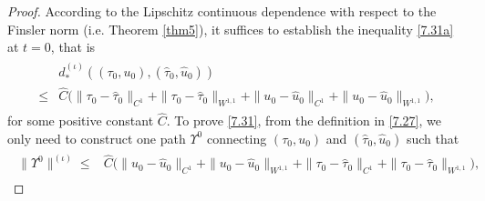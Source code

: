 \documentclass[11pt,reqno]{article}
\numberwithin{equation}{section}
\begin{document}
\begin{proof}
According to the Lipschitz continuous dependence with respect to the Finsler norm (i.e. Theorem \ref{thm5}), it suffices to establish the inequality \eqref{7.31a} at $t=0$, that is
\begin{align}\label{7.31}
\begin{split}
&d_{*}^{(\iota)}((\tau_0, u_0), (\hat{\tau}_0, \hat{u}_0)) \\
\leq & \widehat{C}\Big(\|\tau_0-\hat{\tau}_0\|_{C^1} + \|\tau_0-\hat{\tau}_0\|_{W^{1,1}} + \|u_0-\hat{u}_0\|_{C^1}+  \|u_0-\hat{u}_0\|_{W^{1,1}} \Big),
\end{split}
\end{align}
for some positive constant $\widehat{C}$. To prove \eqref{7.31}, from the definition in \eqref{7.27}, we only need to construct one path $\Upsilon^0$ connecting $(\tau_0, u_0)$ and $(\hat{\tau}_0, \hat{u}_0)$ such that
\begin{align}\label{7.32}
\begin{split}
\|\Upsilon^0\|^{(\iota)}
\leq & \widehat{C}\Big(\|u_0-\hat{u}_0\|_{C^1}+  \|u_0-\hat{u}_0\|_{W^{1,1}} +  \|\tau_0-\hat{\tau}_0\|_{C^1} + \|\tau_0-\hat{\tau}_0\|_{W^{1,1}}\Big),
\end{split}
\end{align}


\end{proof}
\end{document}
